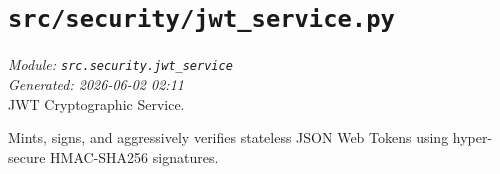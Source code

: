 
\section{\texttt{src/security/jwt\_service.py}}
\textit{Module: \texttt{src.security.jwt\_service}} \\
\textit{Generated: 2026-06-02 02:11} \\

JWT Cryptographic Service.

Mints, signs, and aggressively verifies stateless JSON Web Tokens using
hyper-secure HMAC-SHA256 signatures.
